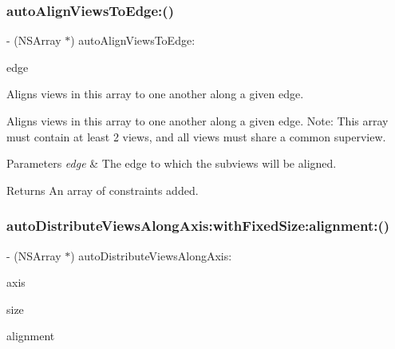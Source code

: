 \subsubsection{\texorpdfstring{auto\+Align\+Views\+To\+Edge\+:()}{autoAlignViewsToEdge:()}}
{\footnotesize\ttfamily -\/ (N\+S\+Array $\ast$) auto\+Align\+Views\+To\+Edge\+: \begin{DoxyParamCaption}\item[{(A\+L\+Edge)}]{edge }\end{DoxyParamCaption}}

Aligns views in this array to one another along a given edge.

Aligns views in this array to one another along a given edge. Note\+: This array must contain at least 2 views, and all views must share a common superview.


\begin{DoxyParams}{Parameters}
{\em edge} & The edge to which the subviews will be aligned. \\
\hline
\end{DoxyParams}
\begin{DoxyReturn}{Returns}
An array of constraints added. 
\end{DoxyReturn}
\mbox{\label{category_n_s_array_07_auto_layout_08_a62dc58a8a134a4860af9c024720ecbb3}} 
\subsubsection{\texorpdfstring{auto\+Distribute\+Views\+Along\+Axis\+:with\+Fixed\+Size\+:alignment\+:()}{autoDistributeViewsAlongAxis:withFixedSize:alignment:()}}
{\footnotesize\ttfamily -\/ (N\+S\+Array $\ast$) auto\+Distribute\+Views\+Along\+Axis\+: \begin{DoxyParamCaption}\item[{(A\+L\+Axis)}]{axis }\item[{withFixedSize:(C\+G\+Float)}]{size }\item[{alignment:(N\+S\+Layout\+Format\+Options)}]{alignment }\end{DoxyParamCaption}}


